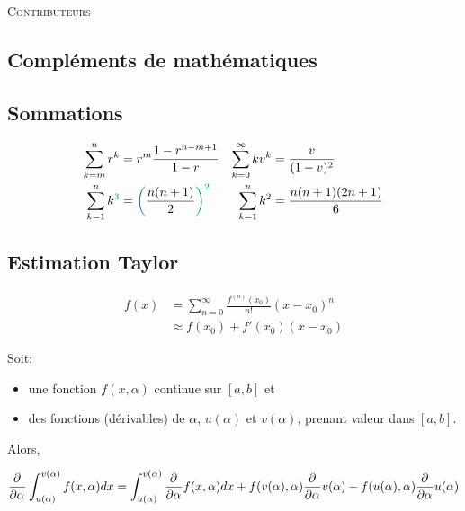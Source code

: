 \documentclass[10pt, french]{article}
\begin{document}
\begin{center}
	\textsc{\Large Contributeurs}\\[0.5cm] 
\end{center}


\newpage

\begin{multicols*}{2}

\section*{Compléments de mathématiques}

\subsection*{Sommations}
\begin{align*}
\sum_{k = m}^{n} r^k &= r^{m} \frac{1 - r^{n - m + 1}}{1 - r} &
\sum_{k = 0}^{\infty}k v^k &= \frac{v}{(1 - v)^2} \\
\sum_{k = 1}^{n}k^{\textcolor{teal}{3}} &= \textcolor{teal}{\bigg(}\frac{n(n + 1)}{2}\textcolor{teal}{\bigg)^{2}} &
\sum_{k = 1}^{n}k^2 &= \frac{n(n + 1)(2n + 1)}{6} \\
\end{align*}

\subsection*{Estimation Taylor}
\begin{align*}
	f(x) 
		&=	\sum_{n = 0}^{\infty} \frac{f^{(n)}(x_0)}{n!}(x - x_0)^{n} \\
		&\approx f(x_0) + f'(x_0) (x - x_0)
\end{align*}

\begin{definitionNOHFILL}
Soit: 
\begin{itemize}
	\item 	une fonction $f(x, \alpha)$ continue sur $[a, b]$ et
	\item des fonctions (dérivables) de $\alpha$, $u(\alpha)$ et $v(\alpha)$, prenant valeur dans $[a, b]$.
\end{itemize}
Alors,

\begin{equation*}
	\frac{\partial^{}}{\partial \alpha^{}} \int_{u(\alpha)}^{v(\alpha)} f(x, \alpha) dx = 
	\int_{u(\alpha)}^{v(\alpha)} \frac{\partial^{}}{\partial \alpha^{}}  f(x, \alpha) dx + f(v(\alpha), \alpha) \frac{\partial^{}}{\partial \alpha^{}} v(\alpha) - f(u(\alpha), \alpha) \frac{\partial^{}}{\partial \alpha^{}} u(\alpha)
\end{equation*}
\end{definitionNOHFILL}


\end{multicols*}
\end{document}
